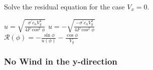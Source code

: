 \documentclass{article}
\begin{document}
\begin{algorithm}[htbp]
\caption{Solve the residual equation for the case $V_x = 0$.}
\begin{algorithmic}


    \State $u = \sqrt{\frac{\sigma^\prime c_n V_y^2}{4 F \cos^2\phi}}$
\Else
    \State $u = -\sqrt{\frac{-\sigma^\prime c_n V_y^2}{4 F \cos^2\phi}}$
\EndIf
\\
\State $\mathcal{R}(\phi) = - \frac{\sin\phi}{u(\phi)} - \frac{\cos\phi}{V_y}$
\end{algorithmic}
\label{alg:Vx0}
\end{algorithm}

%
%
%
%
%
%
%

\subsubsection{No Wind in the y-direction}
\end{document}
